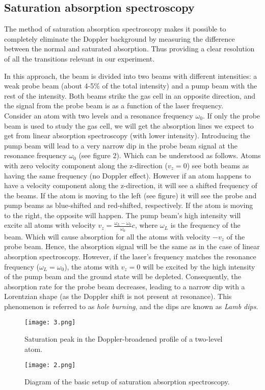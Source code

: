 \documentclass{article}
\begin{document}
\subsection{Saturation absorption spectroscopy}

The method of saturation absorption spectroscopy makes it possible to completely eliminate the Doppler background by measuring the difference between the normal and saturated absorption. Thus providing a clear resolution of all the transitions relevant in our experiment. 

In this approach, the beam is divided into two beams with different intensities: a weak probe beam (about 4-5\% of the total intensity) and a pump beam with the rest of the intensity. Both beams strike the gas cell in an opposite direction, and the signal from the probe beam is as a function of the laser frequency.
\\
Consider an atom with two levels and a resonance frequency $\omega_0$. If only the probe beam is used to study the gas cell, we will get the absorption lines we expect to get from linear absorption spectroscopy (with lower intensity). Introducing the pump beam will lead to a very narrow dip in the probe beam signal at the resonance frequency $\omega_0$ (see figure 2). Which can be understood as follows. Atoms with zero velocity component along the z-direction ($v_z = 0$) see both beams as having the same frequency (no Doppler effect). However if an atom happens to have a velocity component along the z-direction, it will see  a shifted frequency of the beams. If the atom is moving to the left (see figure) it will see the probe and pump beams as blue-shifted and red-shifted, respectively. If the atom is moving to the right, the opposite will happen. The pump beam's high intensity will excite all atoms with velocity $v_z = \frac{\omega_L - \omega_0}{\omega_0}c$, where $\omega_L$ is the frequency of the beam. Which will cause absorption for all the atoms with velocity $-v_z$ of the probe beam. Hence, the absorption signal will be the same as in the case of linear absorption spectroscopy. However, if the laser's frequency matches the resonance frequency ($\omega_L = \omega_0$), the atoms with $v_z =0$ will be excited by the high intensity of the pump beam and the ground state will be depleted. Consequently, the absorption rate for the probe beam decreases, leading to a narrow dip with a Lorentzian shape (as the Doppler shift is not present at resonance). This phenomenon is referred to as \textit{hole burning}, and the dips are known as \textit{Lamb dips}.
\begin{figure}[H]
    \centering
    \texttt{[image: 3.png]}
    \caption{Saturation peak in the Doppler-broadened profile of a two-level atom.}
    \label{fig:enter-label}
\end{figure}
\begin{figure}[H]
    \centering
    \texttt{[image: 2.png]}
    \caption{Diagram of the basic setup of saturation absorption spectroscopy.}
    \label{fig:enter-label}
\end{figure}
\end{document}
